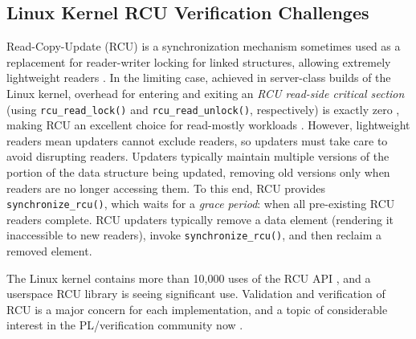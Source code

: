 \documentclass{svjour3}
\begin{document}
\subsection{Linux Kernel RCU Verification Challenges}



Read-Copy-Update (RCU) is a synchronization mechanism sometimes used as a replacement
for reader-writer locking for linked structures, allowing extremely
lightweight readers \cite{McKenney:2013:SDS:2483852.2483867}.
In the limiting case, achieved in server-class builds of the
Linux kernel, overhead for entering and exiting an \emph{RCU read-side
critical section} (using {\tt rcu\_read\_lock()} and {\tt rcu\_read\_unlock()},
respectively) is exactly zero \cite{McKenney98}, making RCU an
excellent choice for read-mostly workloads
\cite{McKenney:2013:SDS:2483852.2483867,DinakarGuniguntala2008IBMSysJ,PaulMcKenney2013AMPenergyHOTPAR}.  
However, lightweight readers mean updaters cannot exclude readers, so updaters must take care to avoid disrupting readers.
Updaters typically maintain multiple versions of the portion of the
data structure being updated, removing old versions only when
readers are no longer accessing them.
To this end, RCU provides {\tt synchronize\_rcu()}, which waits for a
\emph{grace period}: when all pre-existing RCU readers complete.
RCU updaters typically remove a data element (rendering it
inaccessible to new readers), invoke {\tt synchronize\_rcu()},
and then reclaim a removed element.

The Linux kernel contains more than 10,000 uses of the RCU
API \cite{PaulEMcKenneyRCUusagePage}, and a userspace RCU
library \cite{MathieuDesnoyers2009URCU,MathieuDesnoyers2012URCU}
is seeing significant use.  Validation and verification of RCU is a
major concern for each implementation, and a topic of considerable
interest in the PL/verification community now \cite{PLDI15RCU}.

\end{document}

